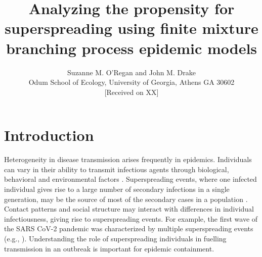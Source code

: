 \documentclass{imammb}
\numberwithin{equation}{section}
\begin{document}
\title{Analyzing the propensity for superspreading using finite mixture branching process epidemic models}
\author{ {\sc Suzanne M. O’Regan and John M. Drake}\\[2pt]
Odum School of Ecology, University of Georgia, Athens GA 30602\\[6pt]
{\rm [Received on XX]}\vspace*{6pt}}
\pagestyle{headings}
\maketitle







\section{Introduction}
Heterogeneity in disease transmission arises frequently in epidemics. Individuals can vary in their ability to transmit infectious agents through biological, behavioral and environmental factors \citep{Lloyd-Smith2005-ma,Funk2010-zj, Althouse2020-dn}. Superspreading events, where one infected individual gives rise to a large number of secondary infections in a single generation, may be the source of most of the secondary cases in a population \citep{Althouse2020-dn}. Contact patterns and social structure may interact with differences in individual infectiousness, giving rise to superspreading events. For example, the first wave of the SARS CoV-2 pandemic was characterized by multiple superspreading events (e.g., \citep{Hamner2020-zt, Adam2020-xk, Lemieux2021-ow, Illingworth2021-rz}). Understanding the role of superspreading individuals in fuelling transmission in an outbreak is important for epidemic containment. 
\end{document}
